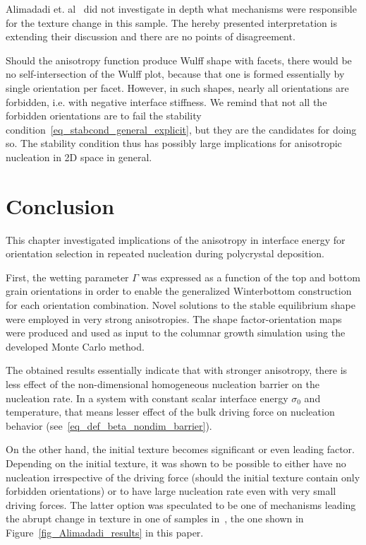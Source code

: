 	Alimadadi et. al~\cite{Alimadadi2016} did not investigate in depth what mechanisms were responsible for the texture change in this sample. The hereby presented interpretation is extending their discussion and there are no points of disagreement.
	
	Should the anisotropy function produce Wulff shape with facets, there would be no self-intersection of the Wulff plot, because that one is formed essentially by single orientation per facet. However, in such shapes, nearly all orientations are forbidden, i.e. with negative interface stiffness. We remind that not all the forbidden orientations are to fail the stability condition~\eqref{eq_stabcond_general_explicit}, but they are the candidates for doing so. The stability condition thus has possibly large implications for anisotropic nucleation in 2D space in general.  

\section{Conclusion}
This chapter investigated implications of the anisotropy in interface energy for orientation selection in repeated nucleation during polycrystal deposition. 

First, the wetting parameter $\Gamma$ was expressed as a function of the top and bottom grain orientations in order to enable the generalized Winterbottom construction for each orientation combination. Novel solutions to the stable equilibrium shape were employed in very strong anisotropies. The shape factor-orientation maps were produced and used as input to the columnar growth simulation using the developed Monte Carlo method.

The obtained results essentially indicate that with stronger anisotropy, there is less effect of the non-dimensional homogeneous nucleation barrier on the nucleation rate. In a system with constant scalar interface energy $\sigma_0$ and temperature, that means lesser effect of the bulk driving force on nucleation behavior (see~\eqref{eq_def_beta_nondim_barrier}). 

On the other hand, the initial texture becomes significant or even leading factor. Depending on the initial texture, it was shown to be possible to either have no nucleation irrespective of the driving force (should the initial texture contain only forbidden orientations) or to have large nucleation rate even with very small driving forces. The latter option was speculated to be one of mechanisms leading the abrupt change in texture in one of samples in~\cite{Alimadadi2016}, the one shown in Figure~\ref{fig_Alimadadi_results} in this paper.

